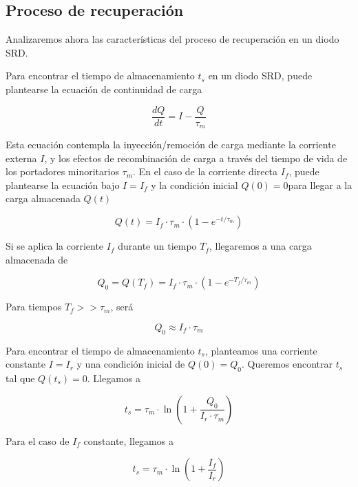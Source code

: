 \subsection{Proceso de recuperación}

Analizaremos ahora las características del proceso de recuperación en un diodo
SRD.

Para encontrar el tiempo de almacenamiento $t_s$ en un diodo SRD, puede
plantearse la ecuación de continuidad de carga \cite{moll1962} \cite{moll1969}

\begin{equation}
    \frac{dQ}{dt} = I-\frac{Q}{\tau_m}
\end{equation}

Esta ecuación contempla la inyección/remoción de carga mediante la corriente
externa $I$, y los efectos de recombinación de carga a través del tiempo de vida
de los portadores minoritarios $\tau_m$. En el caso de la corriente directa
$I_f$, puede plantearse la ecuación bajo $I=I_f$ y la condición inicial $Q(0)=0$para llegar a la carga almacenada $Q(t)$

\begin{equation}
    Q(t) = I_f \cdot \tau_m \cdot \left( 1-e^{-t/\tau_m}\right)
\end{equation}

Si se aplica la corriente $I_f$ durante un tiempo $T_f$, llegaremos a una carga
almacenada de

\begin{equation}
    Q_0 = Q(T_f) = I_f \cdot \tau_m \cdot \left( 1-e^{-T_f/\tau_m}\right)
\end{equation}

Para tiempos $T_f >> \tau_m$, será

\begin{equation}
    Q_0 \approx I_f \cdot \tau_m
\end{equation}

Para encontrar el tiempo de almacenamiento $t_s$, planteamos una corriente
constante $I=I_r$ y una condición inicial de $Q(0)=Q_0$. Queremos encontrar
$t_s$ tal que $Q(t_s) = 0$. Llegamos a

\begin{equation}
    t_s = \tau_m \cdot \ln \left( 1+\frac{Q_0}{I_r \cdot \tau_m}\right)
\end{equation}

Para el caso de $I_f$ constante, llegamos a

\begin{equation}
    t_s = \tau_m \cdot \ln \left( 1+\frac{I_f}{I_r}\right)
\end{equation}

